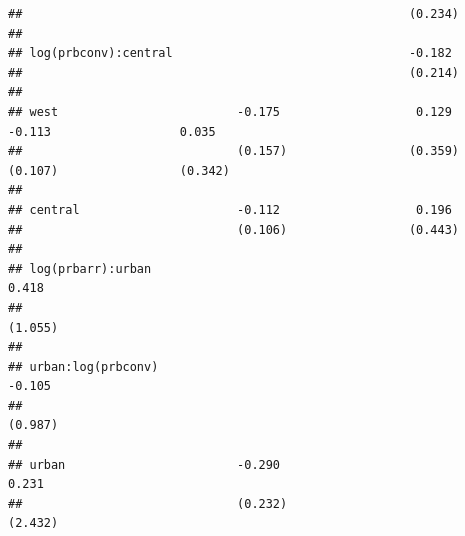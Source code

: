 \documentclass[]{article}
\begin{document}
\begin{verbatim}
##                                                      (0.234)                                                                               
##                                                                                                                                            
## log(prbconv):central                                 -0.182                                                                                
##                                                      (0.214)                                                                               
##                                                                                                                                            
## west                         -0.175                   0.129                                          -0.113                  0.035         
##                              (0.157)                 (0.359)                                        (0.107)                 (0.342)        
##                                                                                                                                            
## central                      -0.112                   0.196                                                                                
##                              (0.106)                 (0.443)                                                                               
##                                                                                                                                            
## log(prbarr):urban                                                             0.418                                                        
##                                                                              (1.055)                                                       
##                                                                                                                                            
## urban:log(prbconv)                                                           -0.105                                                        
##                                                                              (0.987)                                                       
##                                                                                                                                            
## urban                        -0.290                                           0.231                                                        
##                              (0.232)                                         (2.432)                                                       

\end{verbatim}
\end{document}
